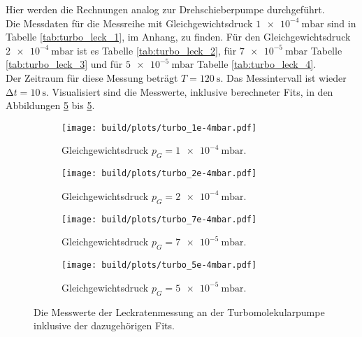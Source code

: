         \noindent
        Hier werden die Rechnungen analog zur Drehschieberpumpe durchgeführt.\\
        Die Messdaten für die Messreihe mit Gleichgewichtsdruck $\SI{1e-4}{\milli\bar}$ sind in Tabelle \ref{tab:turbo_leck_1}, im Anhang, zu finden.
        Für den Gleichgewichtsdruck $\SI{2e-4}{\milli\bar}$ ist es Tabelle \ref{tab:turbo_leck_2}, für  $\SI{7e-5}{\milli\bar}$ Tabelle \ref{tab:turbo_leck_3}
        und für $\SI{5e-5}{\milli\bar}$ Tabelle \ref{tab:turbo_leck_4}.\\
        Der Zeitraum für diese Messung beträgt $ T = \SI{120}{\second}$. Das Messintervall ist wieder $ \increment t = \SI{10}{\second}$.
        Visualisiert sind die Messwerte, inklusive berechneter Fits, in den Abbildungen \ref{img:3} bis \ref{img:3}.
        \begin{figure}[H]
          \begin{subfigure}{0.46\textwidth}
                  \centering
                  \texttt{[image: build/plots/turbo\_1e-4mbar.pdf]}
                  \caption{Gleichgewichtsdruck $p_G = \SI{1e-4}{\milli\bar}$.}
                  \label{img:turbo_leck_1}
          \end{subfigure}
          \hfill
          \begin{subfigure}{0.46\textwidth}
                  \centering
                  \texttt{[image: build/plots/turbo\_2e-4mbar.pdf]}
                  \caption{Gleichgewichtsdruck $p_G = \SI{2e-4}{\milli\bar}$.}
                  \label{img:turbo_leck_2}
          \end{subfigure}
          \hfill
          \begin{subfigure}{0.46\textwidth}
            \centering
            \texttt{[image: build/plots/turbo\_7e-4mbar.pdf]}
            \caption{Gleichgewichtsdruck $p_G = \SI{7e-5}{\milli\bar}$.}
            \label{img:turbo_leck_3}
          \end{subfigure}
          \hfill
          \begin{subfigure}{0.46\textwidth}
            \centering
            \texttt{[image: build/plots/turbo\_5e-4mbar.pdf]}
            \caption{Gleichgewichtsdruck $p_G = \SI{5e-5}{\milli\bar}$.}
            \label{img:turbo_leck_4}
          \end{subfigure}
          \caption{Die Messwerte der Leckratenmessung an der Turbomolekularpumpe inklusive der dazugehörigen Fits. }
          \label{img:3}
      \end{figure}

